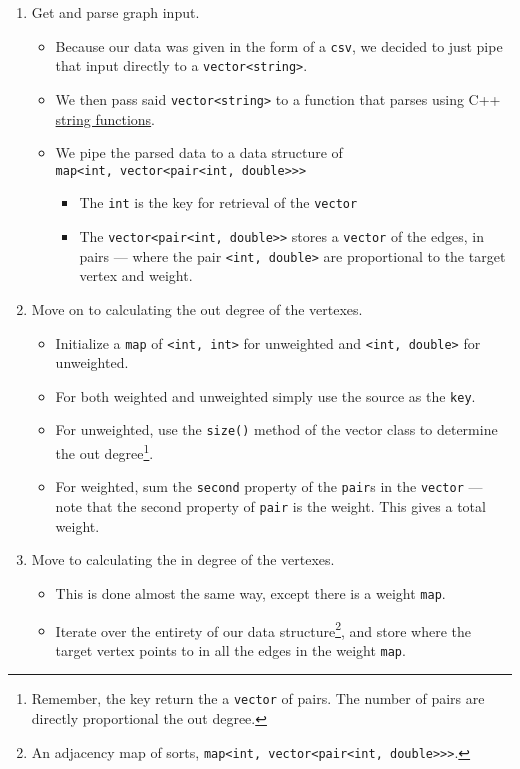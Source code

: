 \documentclass{article}
\newcommand{\shellcmd}[1]{\texttt{\colorbox{gray!30}{#1}}}
\begin{document}
\begin{enumerate}
    \item Get and parse graph input.
    \begin{itemize}
        \item Because our data was given in the form of a \texttt{csv}, we decided to just pipe that input directly to a \shellcmd{vector<string>}.
        \item We then pass said \shellcmd{vector<string>} to a function that parses using C++ \href{http://www.cplusplus.com/reference/string/string/}{string functions}.
        \item We pipe the parsed data to a data structure of \\ \shellcmd{map<int, vector<pair<int, double>>>}
        \begin{itemize}
            \item The \texttt{int} is the key for retrieval of the \shellcmd{vector}
            \item The \shellcmd{vector<pair<int, double>>} stores a \texttt{vector} of the edges, in pairs --- where the pair \shellcmd{<int, double>} are proportional to the target vertex and weight.
        \end{itemize}
    \end{itemize}

    \item Move on to calculating the out degree of the vertexes.
    \begin{itemize}
        \item Initialize a \shellcmd{map} of \shellcmd{<int, int>} for unweighted and \shellcmd{<int, double>} for unweighted.
        \item For both weighted and unweighted simply use the source as the \texttt{key}.
        \item For unweighted, use the \shellcmd{size()} method of the vector class to determine the out degree\footnote{Remember, the key return the a \shellcmd{vector} of pairs. The number of pairs are directly proportional the out degree.}.
        \item For weighted, sum the \shellcmd{second} property of the \shellcmd{pair}s in the \shellcmd{vector} --- note that the second property of \shellcmd{pair} is the weight. This gives a total weight.
     \end{itemize}

    \item Move to calculating the in degree of the vertexes.
    \begin{itemize}
        \item This is done almost the same way, except there is a weight \shellcmd{map}.
        \item Iterate over the entirety of our data structure\footnote{An adjacency map of sorts, \shellcmd{map<int, vector<pair<int, double>>>}.}, and store where the target vertex points to in all the edges in the weight \shellcmd{map}.
    \end{itemize}


\end{enumerate}
\end{document}
